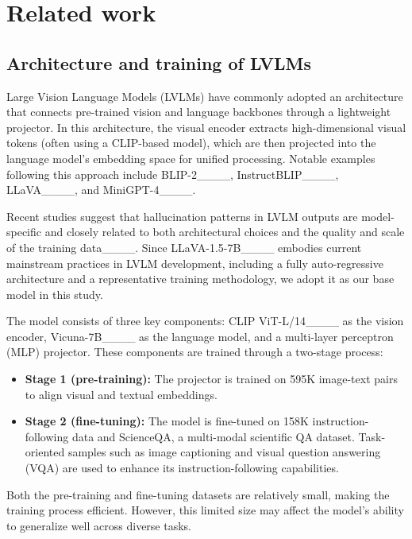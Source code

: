 \section{Related work}
\label{sec-relatedwork}

\subsection{Architecture and training of LVLMs}\label{subsec-training}
Large Vision Language Models (LVLMs) have commonly adopted an architecture that connects pre-trained vision and language backbones through a lightweight projector. In this architecture, the visual encoder extracts high-dimensional visual tokens (often using a CLIP-based model), which are then projected into the language model's embedding space for unified processing. Notable examples following this approach include BLIP-2____, InstructBLIP____, LLaVA____, and MiniGPT-4____.

Recent studies suggest that hallucination patterns in LVLM outputs are model-specific and closely related to both architectural choices and the quality and scale of the training data____. Since LLaVA-1.5-7B____ embodies current mainstream practices in LVLM development, including a fully auto-regressive architecture and a representative training methodology, we adopt it as our base model in this study.

The model consists of three key components: CLIP ViT-L/14____ as the vision encoder, Vicuna-7B____ as the language model, and a multi-layer perceptron (MLP) projector. These components are trained through a two-stage process:

\begin{itemize}
    \item \textbf{Stage 1 (pre-training):} The projector is trained on 595K image-text pairs to align visual and textual embeddings.
    \item \textbf{Stage 2 (fine-tuning):} The model is fine-tuned on 158K instruction-following data and ScienceQA, a multi-modal scientific QA dataset. Task-oriented samples such as image captioning and visual question answering (VQA) are used to enhance its instruction-following capabilities.
\end{itemize}

Both the pre-training and fine-tuning datasets are relatively small, making the training process efficient. However, this limited size may affect the model's ability to generalize well across diverse tasks.

